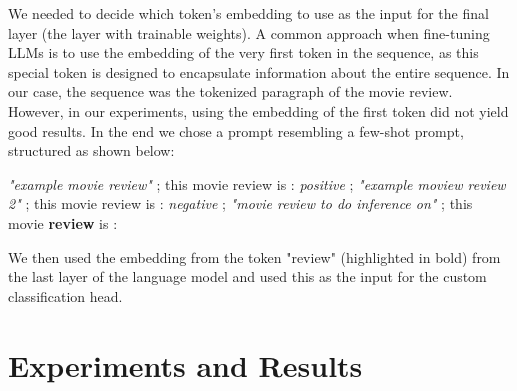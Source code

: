 \documentclass[10pt,twocolumn,letterpaper]{article}
\begin{document}
We needed to decide which token's embedding to use as the input for the final layer (the layer with trainable weights). A common approach when fine-tuning LLMs is to use the embedding of the very first token in the sequence, as this special token is designed to encapsulate information about the entire sequence. In our case, the sequence was the tokenized paragraph of the movie review. However, in our experiments, using the embedding of the first token did not yield good results.
In the end we chose a prompt resembling a few-shot prompt, structured as shown below:

\textit{"example movie review"} ; this movie review is : \textit{positive} ; \textit{"example moview review 2"} ; this movie review is : \textit{negative} ; \textit{"movie review to do inference on"} ; this movie \textbf{review} is :

We then used the embedding from the token "review" (highlighted in bold) from the last layer of the language model and used this as the input for the custom classification head.


\section{Experiments and Results}





\end{document}
